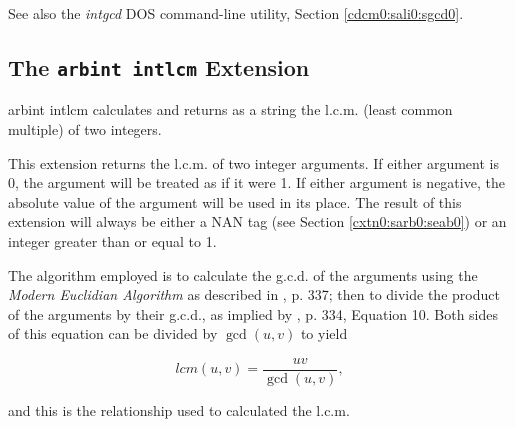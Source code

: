 \begin{tclcommandseealso}
See also the \emph{intgcd} DOS command-line utility, 
Section \cdcmzeroxrefhyphen{}\ref{cdcm0:sali0:sgcd0}.
\end{tclcommandseealso}


\subsection{The \texttt{arbint intlcm} Extension}
\label{cxtn0:sarb0:slcm0}

\begin{tclcommandname}{arbint intlcm}%
calculates and returns as a string the l.c.m. 
(least common multiple) of two integers.
\end{tclcommandname}

\begin{tclcommandsynopsis}
\end{tclcommandsynopsis}

\begin{tclcommanddescription}
This extension returns the l.c.m. of two integer arguments.
If either argument is 0, the argument will be treated as if it
were 1.  If either
argument is negative, the absolute value of the argument
will be used in its place.  The result of this 
extension will always be either a NAN tag
(see Section \ref{cxtn0:sarb0:seab0}) 
or an integer greater than or equal to 1.

The algorithm employed is to calculate
the g.c.d. of the arguments using the
\emph{Modern Euclidian Algorithm} as
described in \cite{bibref:b:knuthclassic2ndedvol2}, p. 337;
then to divide the product of the arguments by their
g.c.d., as implied by \cite{bibref:b:knuthclassic2ndedvol2},
p. 334, Equation 10.  Both sides of this equation can be
divided by $\gcd(u,v)$ to yield

\begin{equation}
lcm(u,v) = \frac{uv}{\gcd(u,v)},
\end{equation}

and this is the relationship used to calculated the l.c.m.
\end{tclcommanddescription}

